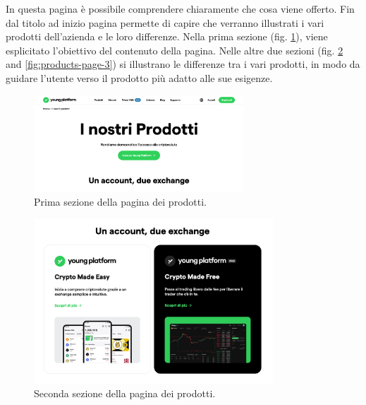 In questa pagina è possibile comprendere chiaramente che cosa viene offerto. 
Fin dal titolo ad inizio pagina permette di capire che verranno illustrati 
i vari prodotti dell'azienda e le loro differenze. Nella prima sezione 
(fig. \ref{fig:products-page-1}), viene esplicitato l'obiettivo del 
contenuto della pagina. Nelle altre due sezioni 
(fig. \ref{fig:products-page-2} and \ref{fig:products-page-3}) si 
illustrano le differenze tra i vari prodotti, in modo da guidare l'utente 
verso il prodotto più adatto alle sue esigenze. 
\begin{figure}[H]
  \centering
  \includegraphics[width=0.70\textwidth]{res/images/internal-pages/products-page/products-page-1.png}
  \caption{Prima sezione della pagina dei prodotti.}
  \label{fig:products-page-1}
\end{figure}

\begin{figure}[H]
  \centering
  \includegraphics[width=0.80\textwidth]{res/images/internal-pages/products-page/products-page-2.png}
  \caption{Seconda sezione della pagina dei prodotti.}
  \label{fig:products-page-2}
\end{figure}

